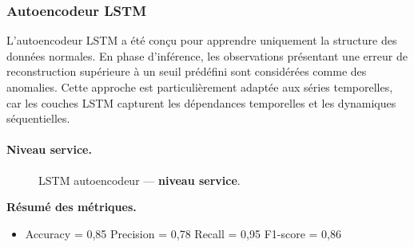 \documentclass[conference]{IEEEtran}
\begin{document}
\subsubsection{\textbf{Autoencodeur LSTM}}

L’autoencodeur LSTM a été conçu pour apprendre uniquement la structure des données normales.  
En phase d’inférence, les observations présentant une erreur de reconstruction supérieure à un seuil prédéfini sont considérées comme des anomalies.  
Cette approche est particulièrement adaptée aux séries temporelles, car les couches LSTM capturent les dépendances temporelles et les dynamiques séquentielles.

\paragraph{Niveau service.}

\begin{figure}[!t]
  \centering
  \hfill%
  \caption{LSTM autoencodeur — \textbf{niveau service}.}
  \label{fig:lstm-service}
\end{figure}

\textbf{Résumé des métriques.}
\begin{itemize}
    \item Accuracy = 0{,}85 \quad
          Precision = 0{,}78 \quad
          Recall = 0{,}95 \quad
          F1-score = 0{,}86
\end{itemize}
\end{document}
